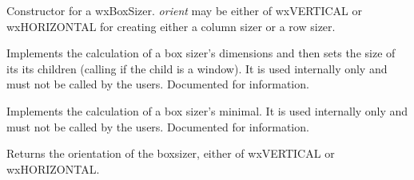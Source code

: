 

\label{wxboxsizerwxboxsizer}


Constructor for a wxBoxSizer. {\it orient} may be either of wxVERTICAL
or wxHORIZONTAL for creating either a column sizer or a row sizer.

\label{wxboxsizerrecalcsizes}


Implements the calculation of a box sizer's dimensions and then sets
the size of its its children (calling 
if the child is a window). It is used internally only and must not be called 
by the users. Documented for information.

\label{wxboxsizercalcmin}


Implements the calculation of a box sizer's minimal. It is used internally
only and must not be called by the users. Documented for information.

\label{wxboxsizergetorientation}


Returns the orientation of the boxsizer, either of wxVERTICAL
or wxHORIZONTAL.

